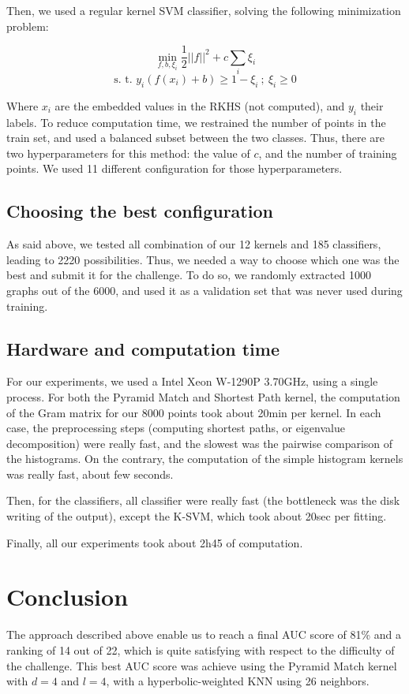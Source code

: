 \documentclass[sigconf, nonacm]{acmart}
\begin{document}
Then, we used a regular kernel SVM classifier, solving the following minimization problem:

$$
\min_{f, b, \xi_i} \frac{1}{2}||f||^2 + c \sum_i\xi_i
$$
$$
\text{s. t. } y_i(f(x_i) + b) \ge 1 - \xi_i \ ; \ \xi_i \ge 0 
$$

Where $x_i$ are the embedded values in the RKHS (not computed), and $y_i$ their labels. To reduce computation time, we restrained the number of points in the train set, and used a balanced subset between the two classes. Thus, there are two hyperparameters for this method: the value of $c$, and the number of training points. We used 11 different configuration for those hyperparameters.

\subsection{Choosing the best configuration}

As said above, we tested all combination of our 12 kernels and 185 classifiers, leading to 2220 possibilities. Thus, we needed a way to choose which one was the best and submit it for the challenge. To do so, we randomly extracted 1000 graphs out of the 6000, and used it as a validation set that was never used during training.

\subsection{Hardware and computation time}

For our experiments, we used a Intel Xeon W-1290P 3.70GHz, using a single process. For both the Pyramid Match and Shortest Path kernel, the computation of the Gram matrix for our 8000 points took about 20min per kernel. In each case, the preprocessing steps (computing shortest paths, or eigenvalue decomposition) were really fast, and the slowest was the pairwise comparison of the histograms. On the contrary, the computation of the simple histogram kernels was really fast, about few seconds.

Then, for the classifiers, all classifier were really fast (the bottleneck was the disk writing of the output), except the K-SVM, which took about 20sec per fitting.

Finally, all our experiments took about 2h45 of computation.

\section{Conclusion}

The approach described above enable us to reach a final AUC score of 81\% and a ranking of 14 out of 22, which is quite satisfying with respect to the difficulty of the challenge. This best AUC score was achieve using the Pyramid Match kernel with $d = 4$ and $l = 4$, with a hyperbolic-weighted KNN using 26 neighbors.




\end{document}
